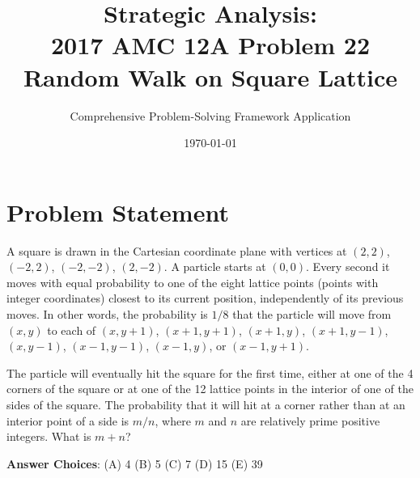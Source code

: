 \documentclass[12pt]{article}
\title{\textbf{Strategic Analysis:\\2017 AMC 12A Problem 22\\Random Walk on Square Lattice}}
\author{Comprehensive Problem-Solving Framework Application}
\date{\today}
\begin{document}
\maketitle

\section*{Problem Statement}

A square is drawn in the Cartesian coordinate plane with vertices at $(2, 2)$, $(-2, 2)$, $(-2, -2)$, $(2, -2)$. A particle starts at $(0,0)$. Every second it moves with equal probability to one of the eight lattice points (points with integer coordinates) closest to its current position, independently of its previous moves. In other words, the probability is $1/8$ that the particle will move from $(x, y)$ to each of $(x, y + 1)$, $(x + 1, y + 1)$, $(x + 1, y)$, $(x + 1, y - 1)$, $(x, y - 1)$, $(x - 1, y - 1)$, $(x - 1, y)$, or $(x - 1, y + 1)$. 

The particle will eventually hit the square for the first time, either at one of the 4 corners of the square or at one of the 12 lattice points in the interior of one of the sides of the square. The probability that it will hit at a corner rather than at an interior point of a side is $m/n$, where $m$ and $n$ are relatively prime positive integers. What is $m + n$?

\textbf{Answer Choices}: (A) 4 \quad (B) 5 \quad (C) 7 \quad (D) 15 \quad (E) 39

\newpage
\end{document}
